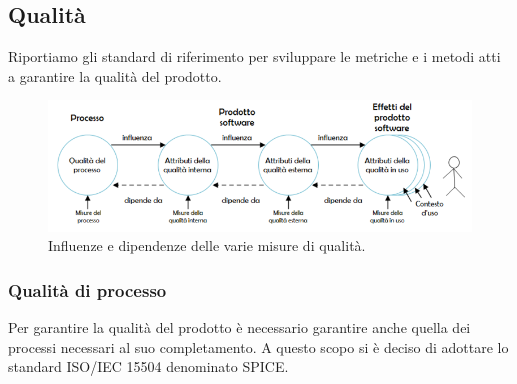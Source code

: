 \documentclass[a4paper]{article}
\begin{document}
			\subsection{Qualità}
Riportiamo gli standard di riferimento per sviluppare le metriche e i metodi atti a garantire la qualità del prodotto.
				\begin{figure}[H]
					\centering
					\includegraphics[scale=0.65]{immagini/Pdq/QualitaDelProdottoSoftware.PNG}
					\caption{Influenze e dipendenze delle varie misure di qualità.}
				\end{figure}
			\subsubsection{Qualità di processo}
				Per garantire la qualità del prodotto è necessario garantire anche quella dei processi necessari 
				al suo completamento. A questo scopo si è deciso di adottare lo standard 
				ISO/IEC 15504 denominato SPICE.
				
\end{document}
